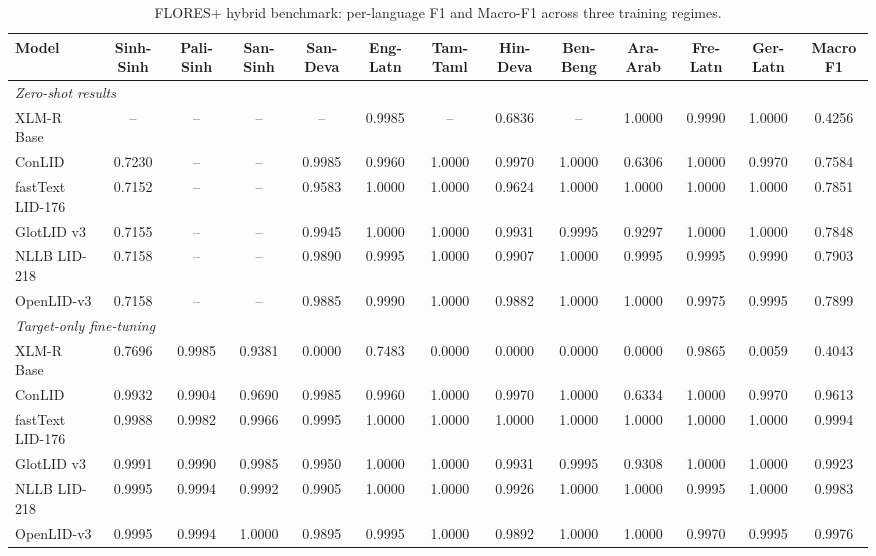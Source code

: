 \documentclass[11pt]{article}
\begin{document}
\begin{table}[p]
\centering
\scriptsize
\setlength{\tabcolsep}{1.4pt}
\renewcommand{\arraystretch}{0.78}
\caption{FLORES+ hybrid benchmark: per-language F1 and Macro-F1 across three training regimes.}
\label{tab:flores_full}
\begin{tabular}{l ccc cccccccc c}
\toprule
\textbf{Model} & \textbf{Sinh-Sinh} & \textbf{Pali-Sinh} & \textbf{San-Sinh} & \textbf{San-Deva} & \textbf{Eng-Latn} & \textbf{Tam-Taml} & \textbf{Hin-Deva} & \textbf{Ben-Beng} & \textbf{Ara-Arab} & \textbf{Fre-Latn} & \textbf{Ger-Latn} & \textbf{Macro F1} \\
\midrule
\multicolumn{13}{l}{\textit{Zero-shot results}} \\
XLM-R Base & -- & -- & -- & -- & 0.9985 & -- & 0.6836 & -- & 1.0000 & 0.9990 & 1.0000 & 0.4256 \\
ConLID & 0.7230 & -- & -- & 0.9985 & 0.9960 & 1.0000 & 0.9970 & 1.0000 & 0.6306 & 1.0000 & 0.9970 & 0.7584 \\
fastText LID-176 & 0.7152 & -- & -- & 0.9583 & 1.0000 & 1.0000 & 0.9624 & 1.0000 & 1.0000 & 1.0000 & 1.0000 & 0.7851 \\
GlotLID v3 & 0.7155 & -- & -- & 0.9945 & 1.0000 & 1.0000 & 0.9931 & 0.9995 & 0.9297 & 1.0000 & 1.0000 & 0.7848 \\
NLLB LID-218 & 0.7158 & -- & -- & 0.9890 & 0.9995 & 1.0000 & 0.9907 & 1.0000 & 0.9995 & 0.9995 & 0.9990 & 0.7903 \\
OpenLID-v3 & 0.7158 & -- & -- & 0.9885 & 0.9990 & 1.0000 & 0.9882 & 1.0000 & 1.0000 & 0.9975 & 0.9995 & 0.7899 \\
\midrule
\multicolumn{13}{l}{\textit{Target-only fine-tuning}} \\
XLM-R Base & 0.7696 & 0.9985 & 0.9381 & 0.0000 & 0.7483 & 0.0000 & 0.0000 & 0.0000 & 0.0000 & 0.9865 & 0.0059 & 0.4043 \\
ConLID & 0.9932 & 0.9904 & 0.9690 & 0.9985 & 0.9960 & 1.0000 & 0.9970 & 1.0000 & 0.6334 & 1.0000 & 0.9970 & 0.9613 \\
fastText LID-176 & 0.9988 & 0.9982 & 0.9966 & 0.9995 & 1.0000 & 1.0000 & 1.0000 & 1.0000 & 1.0000 & 1.0000 & 1.0000 & 0.9994 \\
GlotLID v3 & 0.9991 & 0.9990 & 0.9985 & 0.9950 & 1.0000 & 1.0000 & 0.9931 & 0.9995 & 0.9308 & 1.0000 & 1.0000 & 0.9923 \\
NLLB LID-218 & 0.9995 & 0.9994 & 0.9992 & 0.9905 & 1.0000 & 1.0000 & 0.9926 & 1.0000 & 1.0000 & 0.9995 & 1.0000 & 0.9983 \\
OpenLID-v3 & 0.9995 & 0.9994 & 1.0000 & 0.9895 & 0.9995 & 1.0000 & 0.9892 & 1.0000 & 1.0000 & 0.9970 & 0.9995 & 0.9976 \\

\end{tabular}
\end{table}
\end{document}
